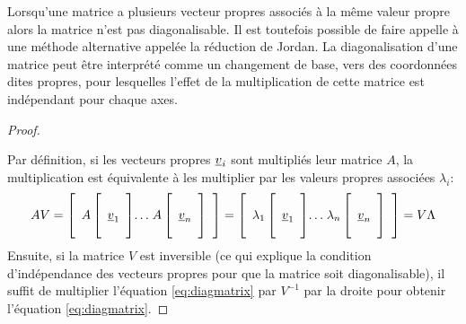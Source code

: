 Lorsqu'une matrice a plusieurs vecteur propres associés à la même valeur propre alors la matrice n'est pas diagonalisable. Il est toutefois possible de faire appelle à une méthode alternative appelée la réduction de Jordan. 
%
La diagonalisation d'une matrice peut être interprété comme un changement de base, vers des coordonnées dites propres, pour lesquelles l'effet de la multiplication de cette matrice est indépendant pour chaque axes. 


\begin{proof}
\label{sec:preuvediag}

Par définition, si les vecteurs propres $\underline{v}_i$ sont multipliés leur matrice $A$, la multiplication est équivalente à les multiplier par les valeurs propres associées $\lambda_i$:
%
\begin{align}
A V = 
\left[ \begin{array}{c@{}c@{}c}  
A \left[   \begin{array}{c}  \\ \underline{v}_1 \\ \\ \end{array} \right] &  \ldots & \; A \left[  \begin{array}{c} \\ \underline{v}_n \\ \\ \end{array} \right]
\end{array} \right]
= 
\left[ \begin{array}{c@{}c@{}c}  
\lambda_1 \left[   \begin{array}{c}  \\ \underline{v}_1 \\ \\ \end{array} \right] &  \ldots & \;\lambda_n \left[  \begin{array}{c} \\  \underline{v}_n \\ \\ \end{array} \right]
\end{array} \right]
= V \Lambda
\end{align}
\label{eq:diagproof}
Ensuite, si la matrice $V$ est inversible (ce qui explique la condition d'indépendance des vecteurs propres pour que la matrice soit diagonalisable), il suffit de multiplier l'équation \eqref{eq:diagmatrix} par $V^{-1}$ par la droite pour obtenir l'équation \eqref{eq:diagmatrix}. 
\end{proof}



